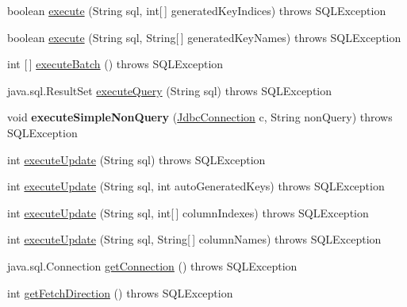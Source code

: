 \begin{DoxyCompactItemize}
boolean \mbox{\hyperlink{classcom_1_1mysql_1_1cj_1_1jdbc_1_1_statement_impl_ae74dd4c72023e709b23c9ea71ca1678a}{execute}} (String sql, int\mbox{[}$\,$\mbox{]} generated\+Key\+Indices)  throws S\+Q\+L\+Exception 
\item 
boolean \mbox{\hyperlink{classcom_1_1mysql_1_1cj_1_1jdbc_1_1_statement_impl_a165371a7abd4d72d54a8ceaf0066aee1}{execute}} (String sql, String\mbox{[}$\,$\mbox{]} generated\+Key\+Names)  throws S\+Q\+L\+Exception 
\item 
int \mbox{[}$\,$\mbox{]} \mbox{\hyperlink{classcom_1_1mysql_1_1cj_1_1jdbc_1_1_statement_impl_a812ff94727864cc68fe96aaa38dbce6a}{execute\+Batch}} ()  throws S\+Q\+L\+Exception 
\item 
java.\+sql.\+Result\+Set \mbox{\hyperlink{classcom_1_1mysql_1_1cj_1_1jdbc_1_1_statement_impl_ad8bdf41d3e788681fe1adcf961b176ef}{execute\+Query}} (String sql)  throws S\+Q\+L\+Exception 
\item 
\mbox{\label{classcom_1_1mysql_1_1cj_1_1jdbc_1_1_statement_impl_a27a4381bb8f1b302a3f8e06cf3276023}} 
void {\bfseries execute\+Simple\+Non\+Query} (\mbox{\hyperlink{interfacecom_1_1mysql_1_1cj_1_1jdbc_1_1_jdbc_connection}{Jdbc\+Connection}} c, String non\+Query)  throws S\+Q\+L\+Exception 
\item 
int \mbox{\hyperlink{classcom_1_1mysql_1_1cj_1_1jdbc_1_1_statement_impl_a8df7dbcd016833437419cfdbae14b187}{execute\+Update}} (String sql)  throws S\+Q\+L\+Exception 
\item 
int \mbox{\hyperlink{classcom_1_1mysql_1_1cj_1_1jdbc_1_1_statement_impl_a17446c85d153a1456965eb64858b5f46}{execute\+Update}} (String sql, int auto\+Generated\+Keys)  throws S\+Q\+L\+Exception 
\item 
int \mbox{\hyperlink{classcom_1_1mysql_1_1cj_1_1jdbc_1_1_statement_impl_a2ff60b126d55ceb7d991c9d5f56cebb6}{execute\+Update}} (String sql, int\mbox{[}$\,$\mbox{]} column\+Indexes)  throws S\+Q\+L\+Exception 
\item 
int \mbox{\hyperlink{classcom_1_1mysql_1_1cj_1_1jdbc_1_1_statement_impl_ad715518d5ddeca0a3a8771646c467d0b}{execute\+Update}} (String sql, String\mbox{[}$\,$\mbox{]} column\+Names)  throws S\+Q\+L\+Exception 
\item 
java.\+sql.\+Connection \mbox{\hyperlink{classcom_1_1mysql_1_1cj_1_1jdbc_1_1_statement_impl_a5e4c41ddb78ca7533f4984c9f6c996c4}{get\+Connection}} ()  throws S\+Q\+L\+Exception 
\item 
int \mbox{\hyperlink{classcom_1_1mysql_1_1cj_1_1jdbc_1_1_statement_impl_ab0ef6daffffd7fd9dc6405c78b697b7d}{get\+Fetch\+Direction}} ()  throws S\+Q\+L\+Exception 

\end{DoxyCompactItemize}
